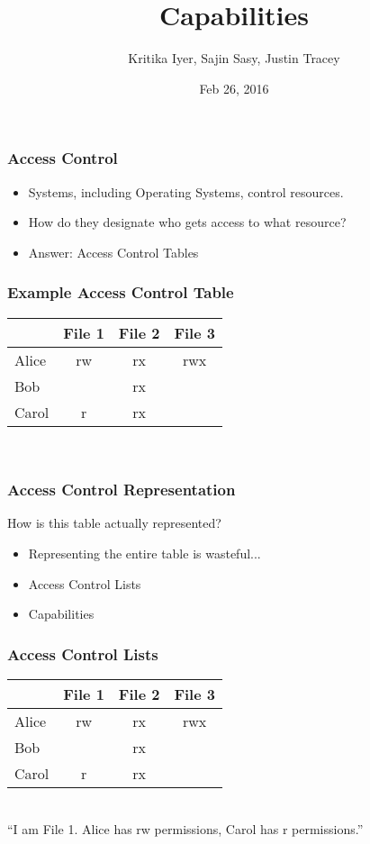 \documentclass[xcolor=table]{beamer}
\title{Capabilities}
\date{Feb 26, 2016}
\author{Kritika Iyer, Sajin Sasy, Justin Tracey}
\begin{document}
\frame{\titlepage}

\begin{frame}
  \frametitle{Access Control}
  \begin{itemize}
  \item Systems, including Operating Systems, control resources.
  \item How do they designate who gets access to what resource?
  \item Answer: Access Control Tables
  \end{itemize}
\end{frame}

\begin{frame}
  \frametitle{Example Access Control Table}
  \begin{center}
    \begin{tabular}{|l||c|c|c|}
      \hline
      &File 1&File 2&File 3\\
      \hline
      \hline
      Alice&rw&rx&rwx\\
      \hline
      Bob&&rx&\\
      \hline
      Carol&r&rx&\\
      \hline
    \end{tabular}\\
    \vspace{10pt}
  \end{center}
\end{frame}

\begin{frame}
  \frametitle{Access Control Representation}
  How is this table actually represented?
  \begin{itemize}
  \item Representing the entire table is wasteful... \pause
  \item Access Control Lists
  \item Capabilities
  \end{itemize}
\end{frame}

\begin{frame}
  \frametitle{Access Control Lists}
  \begin{center}
    \begin{tabular}{|l||c|c|c|}
      \hline
      &\cellcolor{green}File 1&File 2&File 3\\
      \hline
      \hline
      Alice&\cellcolor{green}rw&rx&rwx\\
      \hline
      Bob&\cellcolor{green}&rx&\\
      \hline
      Carol&\cellcolor{green}r&rx&\\
      \hline
    \end{tabular}\\
    \vspace{10pt}
    ``I am File 1. Alice has rw permissions, Carol has r permissions.''
  \end{center}
\end{frame}
\end{document}
